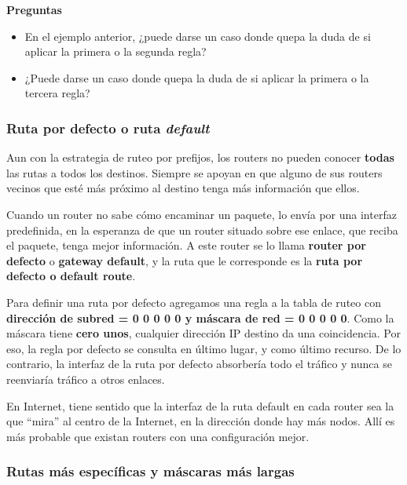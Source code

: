 \documentclass[spanish,A4,]{article}
\begin{document}
\textbf{Preguntas}

\begin{itemize}
\itemsep1pt\parskip0pt
\item
  En el ejemplo anterior, ¿puede darse un caso donde quepa la duda de si
  aplicar la primera o la segunda regla?
\item
  ¿Puede darse un caso donde quepa la duda de si aplicar la primera o la
  tercera regla?
\end{itemize}

\subsubsection{Ruta por defecto o ruta
\emph{default}}\label{ruta-por-defecto-o-ruta-default}

Aun con la estrategia de ruteo por prefijos, los routers no pueden
conocer \textbf{todas} las rutas a todos los destinos. Siempre se apoyan
en que alguno de sus routers vecinos que esté más próximo al destino
tenga más información que ellos.

Cuando un router no sabe cómo encaminar un paquete, lo envía por una
interfaz predefinida, en la esperanza de que un router situado sobre ese
enlace, que reciba el paquete, tenga mejor información. A este router se
lo llama \textbf{router por defecto} o \textbf{gateway default}, y la
ruta que le corresponde es la \textbf{ruta por defecto o default route}.

Para definir una ruta por defecto agregamos una regla a la tabla de
ruteo con \textbf{dirección de subred = 0 0 0 0 0 y máscara de red = 0 0 0 0 0}.
Como la máscara tiene \textbf{cero unos}, cualquier dirección IP destino
da una coincidencia. Por eso, la regla por defecto se consulta en último
lugar, y como último recurso. De lo contrario, la interfaz de la ruta
por defecto absorbería todo el tráfico y nunca se reenviaría tráfico a
otros enlaces.

En Internet, tiene sentido que la interfaz de la ruta default en cada
router sea la que ``mira'' al centro de la Internet, en la dirección
donde hay más nodos. Allí es más probable que existan routers con una
configuración mejor.

\subsubsection{Rutas más específicas y máscaras más
largas}\label{rutas-muxe1s-especuxedficas-y-muxe1scaras-muxe1s-largas}
\end{document}

